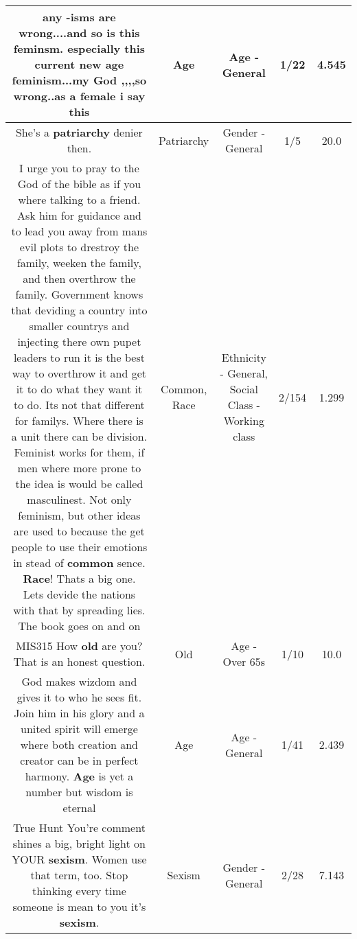 \documentclass[11pt]{article}
\newlength\mylength
\begin{document}
\begin{center}
\begin{longtable}{|C{.65\mylength}|C{.30\mylength}|C{.12\mylength}|C{.12\mylength}|C{.12\mylength}|}
  \small any -isms are wrong....and so is this feminsm. especially this current new \textbf{age} feminism...my God ,,,,so wrong..as a female i say this\normalsize   & Age & Age - General & 1/22 & 4.545 \\  \hline
  \small She's a \textbf{patriarchy} denier then.\normalsize   & Patriarchy & Gender - General & 1/5 & 20.0 \\  \hline
  \small I urge you to pray to the God of the bible as if you where talking to a friend. Ask him for guidance and to lead you away from mans evil plots to drestroy the family, weeken the family, and then overthrow the family. Government knows that deviding a country into smaller countrys and injecting there own pupet leaders to run it is the best way to overthrow it and get it to do what they want it to do. Its not that different for familys. Where there is a unit there can be division. Feminist works for them, if men where more prone to the idea is would be called masculinest. Not only feminism, but other ideas are used to because the get people to use their emotions in stead of \textbf{common} sence. \textbf{Race}! Thats a big one. Lets devide the nations with that by spreading lies. The book goes on and on\normalsize   & Common, Race & Ethnicity - General, Social Class - Working class & 2/154 & 1.299 \\  \hline
  \small MIS315 How \textbf{old} are you?That is an honest question.\normalsize   & Old & Age - Over 65s & 1/10 & 10.0 \\  \hline
  \small God makes wizdom and gives it to who he sees fit. Join him in his glory and a united spirit will emerge where both creation and creator can be in perfect harmony. \textbf{Age} is yet a number but wisdom is eternal\normalsize   & Age & Age - General & 1/41 & 2.439 \\  \hline
  \small True Hunt You're comment shines a big,  bright light on YOUR \textbf{sexism}. Women use that term, too. Stop thinking every time someone is mean to you it's \textbf{sexism}.\normalsize   & Sexism & Gender - General & 2/28 & 7.143 \\  \hline

\end{longtable}
\end{center}
\end{document}
